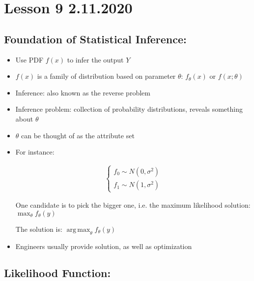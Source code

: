 \documentclass[11pt,letterpaper,titlepage]{article}
\DeclareMathOperator*{\argmax}{arg\,max}
\begin{document}
\newpage

\section{Lesson 9 2.11.2020}

\subsection{Foundation of Statistical Inference:}

\begin{itemize}

    \item Use PDF $f(x)$ to infer the output $Y$
    
    \item $f(x)$ is a family of distribution based on parameter $\theta$: $f_\theta(x)$ or $f(x;\theta)$
    
    \item Inference: also known as the reverse problem
    
    \item Inference problem: collection of probability distributions, reveals something about $\theta$
    
    \item $\theta$ can be thought of as the attribute set
    
    \item For instance:
    
    \begin{gather*}
        \begin{cases}
            f_0 \sim N(0, \sigma^2) \\
            f_1 \sim N(1, \sigma^2)
        \end{cases}
    \end{gather*}
    
    One candidate is to pick the bigger one, i.e. the maximum likelihood solution: $\max_{\theta} f_{\theta}(y)$
    
    The solution is: $\argmax_{\theta} f_{\theta}(y)$
    
    \item Engineers usually provide solution, as well as optimization
    
\end{itemize}

\subsection{Likelihood Function:}
\end{document}
